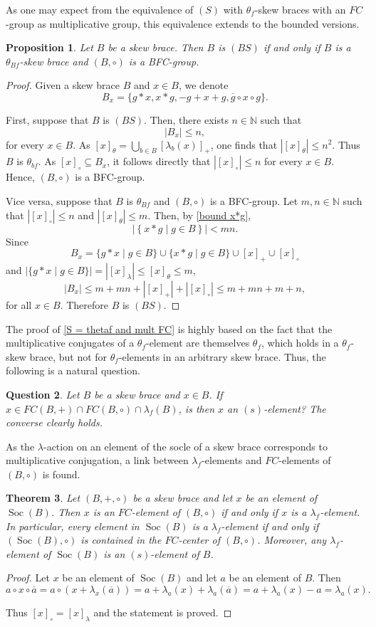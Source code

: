 \documentclass{amsart}
\newcommand{\N}{\mathbb{N}}
\newcommand{\Soc}{\operatorname{Soc}}
\newtheorem{thm}{Theorem}[section]
\newtheorem{pro}[thm]{Proposition}
\newtheorem{question}[thm]{Question}
\begin{document}
As one may expect from the equivalence of $(S)$ with $\theta_f$-skew braces with an $FC$-group as multiplicative group, this equivalence extends to the bounded versions.
\begin{pro}
    Let $B$ be a skew brace.
    Then $B$ is $(BS)$ if and only if $B$ is a $\theta_{Bf}$-skew brace and 
    $(B,\circ)$ is a BFC-group.
\end{pro}
\begin{proof}
Given a skew brace $B$ and $x\in B$, 
we denote 
\[
B_x=\{g*x,x*g,-g+x+g, \overline{g} \circ x \circ g\}.
\]

First, suppose that $B$ is $(BS)$.
Then, there exists $n\in\N$ such that
\[
|B_x|\leq n,
\]
for every $x\in B$. As 
$[x]_\theta=\bigcup_{b\in B}[\lambda_b(x)]_+$, one finds that $|[x]_\theta|\leq n^2$. Thus $B$ is $\theta_{bf}$. As $[x]_\circ\subseteq B_x$,
it follows directly that $|[x]_\circ|\leq n$ for every $x\in B$.
Hence, $(B,\circ)$ is a BFC-group.

Vice versa, suppose that $B$ is $\theta_{Bf}$ and $(B,\circ)$ is a BFC-group.
Let $m,n\in \N$ such that $|[x]_\circ |\leq n$ and $|[x]_\theta|\leq m$.
Then, by \cref{bound x*g}, 
\[
|\left\lbrace x*g \mid g \in B\right\rbrace|<mn.
\]
Since 
\[
B_x=\{g*x \mid g \in B \}\cup\{x*g \mid g \in B\}\cup [x]_+\cup [x]_\circ
\]
 and $ |\{g*x \mid g \in B \}|=|[x]_\lambda|\leq [x]_\theta\leq m$,
\[
|B_x|\leq m+mn+|[x]_+|+|[x]_\circ|\leq m+mn+m+n,
\]
for all $x\in B$.
Therefore $B$ is $(BS)$.
\end{proof}

The proof of \cref{S = thetaf and mult FC} is highly based on the fact that the multiplicative conjugates of a $\theta_f$-element are themselves $\theta_f$, which holds in a $\theta_f$-skew brace, but not for $\theta_f$-elements in an arbitrary skew brace. Thus, the following is a natural question.
\begin{question}
    Let $B$ be a skew brace and $x \in B$. If $x \in FC(B,+) \cap FC(B,\circ) \cap \lambda_f(B)$, is then $x$ an $(s)$-element? The converse clearly holds.
\end{question}
As the $\lambda$-action on an element of the socle of a skew brace corresponds to multiplicative conjugation, a link between $\lambda_f$-elements and $FC$-elements of $(B,\circ)$ is found. 
\begin{thm}
    Let $(B,+,\circ)$ be a skew  brace and let $x$ be an element of $\Soc(B)$. Then $x$ is an $FC$-element of $(B,\circ)$ if and only if $x$ is a $\lambda_f$-element. In particular, every element in $\Soc(B)$ is a $\lambda_f$-element if and only if $(\Soc(B),\circ)$ is contained in the $FC$-center of $(B,\circ)$. Moreover, any $\lambda_f$-element of $\Soc(B)$ is an $(s)$-element of $B$.
\end{thm}
\begin{proof}
    Let $x$ be an element of $\Soc(B)$ and let $a$ be an element of $B$.
    Then 
    \[
    a\circ x\circ\overline{a} 
    =a\circ (x+\lambda_x(\overline{a}))
    =a+\lambda_a(x)+\lambda_a(\overline{a})
    =a+\lambda_a(x)-a=\lambda_a(x).
    \]

    Thus $[x]_\circ=[x]_\lambda$ and the statement is proved.
\end{proof}
\end{document}
